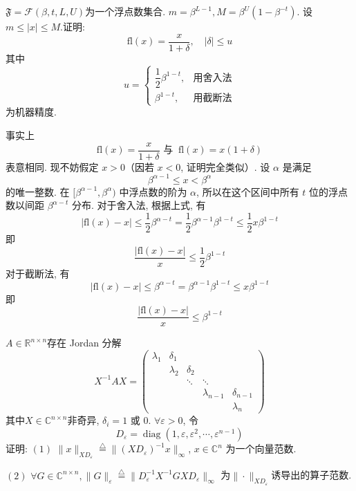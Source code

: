 \documentclass[12pt, answers]{exam}     %
\newcommand{\R}{\mathbb{R}}
\newcommand{\C}{\mathbb{C}}
\begin{document}
\begin{questions}
\question{}
$\mathfrak{F} = \mathcal{F}(\beta, t, L, U)$为一个浮点数集合. $m = \beta^{L - 1}, M = \beta^U(1 - \beta^{-t})$.
设 \( m \leq |x| \leq M \).证明:
\[
\mathrm{fl}(x) = \frac{x}{1 + \delta},\quad |\delta| \leq u
\]
其中
\[
u = 
\begin{cases} 
\dfrac{1}{2} \beta^{1 - t}, & \text{用舍入法} \\ 
\beta^{1 - t}, & \text{用截断法}
\end{cases}
\]
为机器精度.

\begin{solution}
事实上\[\mathrm{fl}(x) = \dfrac{x}{1 + \delta} \text{ 与 }\ \mathrm{fl}(x) = x(1 + \delta)\]表意相同.
现不妨假定 \( x > 0 \)（因若 \( x < 0 \), 证明完全类似）. 设 \( \alpha \) 是满足
\[
\beta^{\alpha - 1} \leq x < \beta^{\alpha}
\]
的唯一整数. 在 \( [\beta^{\alpha - 1}, \beta^{\alpha}) \) 中浮点数的阶为 \( \alpha \), 所以在这个区间中所有 \( t \) 位的浮点数以间距 \( \beta^{\alpha - t} \) 分布. 对于舍入法, 根据上式, 有
\[
|\mathrm{fl}(x) - x| \leq \frac{1}{2} \beta^{\alpha - t} = \frac{1}{2} \beta^{\alpha - 1} \beta^{1 - t} \leq \frac{1}{2} x \beta^{1 - t}
\]
即 
\[
\frac{|\mathrm{fl}(x) - x|}{x} \leq \frac{1}{2}\beta^{1-t}
\]
对于截断法, 有
\[
|\mathrm{fl}(x) - x| \leq \beta^{\alpha - t} = \beta^{\alpha - 1}\beta^{1 - t} \leq x\beta^{1 - t}
\]
即
\[
\frac{|\mathrm{fl}(x) - x|}{x} \leq \beta^{1 - t}
\]
\end{solution}

\question{}
$A \in \R^{n \times n}$存在 Jordan 分解
\[
X^{-1} A X = 
\begin{pmatrix}
\lambda_1 & \delta_1 & & & \\
& \lambda_2 & \delta_2 & & \\
& & \ddots & \ddots & \\
& & & \lambda_{n-1} & \delta_{n-1} \\
& & & & \lambda_n
\end{pmatrix}
\]
其中$X \in \C^{n \times n}$非奇异, \(\delta_i = 1\) 或 \(0\). \( \forall \varepsilon > 0 \), 令
\[
D_\varepsilon = \operatorname{diag}(1, \varepsilon, \varepsilon^2, \cdots, \varepsilon^{n-1})
\]
证明:
$ \left( 1 \right) $ $\|x\|_{XD_\varepsilon} \overset{\triangle}{=} \|(XD_{\varepsilon})^{-1}x\|_{\infty}$, $x \in \C^n$ 为一个向量范数.

$ \left( 2 \right) $ $\forall G \in \C^{n \times n}, \|G\|_{\varepsilon} \overset{\triangle}{=} \|D^{-1}_{\varepsilon}X^{-1}GXD_{\varepsilon}\|_{\infty}$ 为$\| \cdot \|_{XD_\varepsilon}$诱导出的算子范数.


\end{questions}
\end{document}
